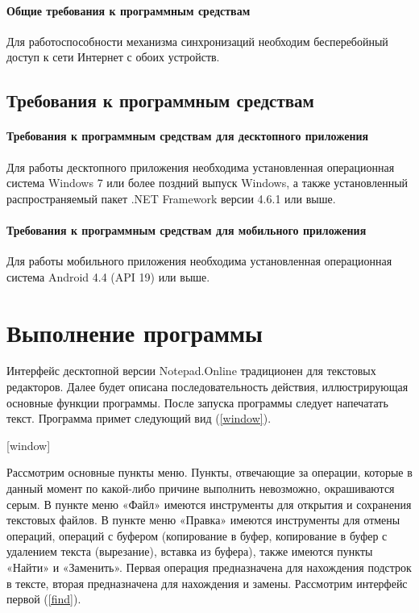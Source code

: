 ﻿\documentclass[opermanual]{espd}
\begin{document}
\paragraph{Общие требования к программным средствам}
Для работоспособности механизма синхронизаций необходим бесперебойный доступ к сети Интернет с обоих устройств.

\subsection{Требования к программным средствам}
\paragraph{Требования к программным средствам для десктопного приложения}
Для работы десктопного приложения необходима установленная операционная система Windows 7 или более поздний выпуск Windows, а также установленный распространяемый пакет .NET Framework версии 4.6.1 или выше.

\paragraph{Требования к программным средствам для мобильного приложения}
Для работы мобильного приложения необходима установленная операционная система Android 4.4 (API 19) или выше.

\section{Выполнение программы}

Интерфейс десктопной версии Notepad.Online традиционен для текстовых редакторов. Далее будет описана последовательность действия, иллюстрирующая основные функции программы. После запуска программы следует напечатать текст. Программа примет следующий вид (\ref{window}).

[window]

Рассмотрим основные пункты меню. Пункты, отвечающие за операции, которые в данный момент по какой-либо причине выполнить невозможно, окрашиваются серым. В пункте меню «Файл» имеются инструменты для открытия и сохранения текстовых файлов. В пункте меню «Правка» имеются инструменты для отмены операций, операций с буфером (копирование в буфер, копирование в буфер с удалением текста (вырезание), вставка из буфера), также имеются пункты «Найти» и «Заменить». Первая операция предназначена для нахождения подстрок в тексте, вторая предназначена для нахождения и замены. Рассмотрим интерфейс первой (\ref{find}).
\end{document}
